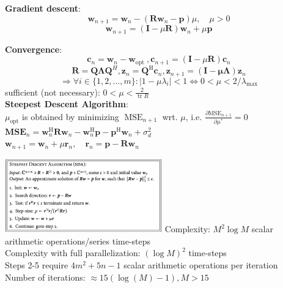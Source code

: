 \documentclass[english]{latex4ei/latex4ei_sheet}
\begin{document}
\begin{sectionbox}
  \textbf{Gradient descent}:\\
  $$\boldsymbol{w}_{n+1}=\boldsymbol{w}_{n}-\left(\boldsymbol{R} \boldsymbol{w}_{n}-\boldsymbol{p}\right) \mu, \quad \mu>0$$
  $$\boldsymbol{w}_{n+1}=(\mathbf{I}-\mu \boldsymbol{R}) \boldsymbol{w}_{n}+\mu \boldsymbol{p}$$
  
  \textbf{Convergence}:\\
  $$\boldsymbol{c}_{n}=\boldsymbol{w}_{n}-\boldsymbol{w}_{\text {opt }}, \boldsymbol{c}_{n+1}=(\mathbf{I}-\mu \mathbf{R}) \boldsymbol{c}_{n}$$
  $$\boldsymbol{R}=\boldsymbol{Q}\boldsymbol{\Lambda}\boldsymbol{Q}^H, \boldsymbol{z}_{n}=\mathbf{Q}^{\mathrm{H}} \boldsymbol{c}_{n}, \boldsymbol{z}_{n+1}=(\mathbf{I}-\boldsymbol{\mu} \boldsymbol{\Lambda}) \boldsymbol{z}_{n}$$
  $$\Rightarrow \forall i \in\{1,2, \ldots, m\}: \left|1-\mu \lambda_{i}\right|<1 \Leftrightarrow 0< \mu < 2/\lambda_{\text{max}}$$
  sufficient (not necessary): $0<\mu<\frac{2}{\operatorname{tr} R}$\\ 
  
  \textbf{Steepest Descent Algorithm}:\\
  $\mu_{\mathrm{opt}}$ is obtained by minimizing $\operatorname{MSE}_{n+1}$ wrt. $\mu$, i.e. $\frac{\partial \mathrm{MSE}_{n+1}}{\partial \mu^{*}} = 0$
  $\mathbf{M S E}_{n}=\boldsymbol{w}_{n}^{\mathrm{H}} \boldsymbol{R} \boldsymbol{w}_{n}-\boldsymbol{w}_{n}^{\mathrm{H}} \boldsymbol{p}-\boldsymbol{p}^{\mathrm{H}} \boldsymbol{w}_{n}+\sigma_{d}^{2}$\\
  $\boldsymbol{w}_{n+1}=\boldsymbol{w}_{n}+\mu \boldsymbol{r}_{n},\quad \boldsymbol{r}_{n} = \boldsymbol{p}-\boldsymbol{R}\boldsymbol{w}_{n}$\\
\end{sectionbox}
\begin{sectionbox}
\includegraphics[width = 6.8cm]{img/sda.png}
Complexity: $M^{2} \log M$ scalar arithmetic operations/series time-steps\\
Complexity with full parallelization: $(\log M)^{2}$ time-steps\\
Steps 2-5 require $4m^2+5n-1$ scalar arithmetic operations per iteration\\
Number of iterations: $\approx 15(\operatorname{log}(M)-1), M > 15$
\end{sectionbox}
\end{document}
